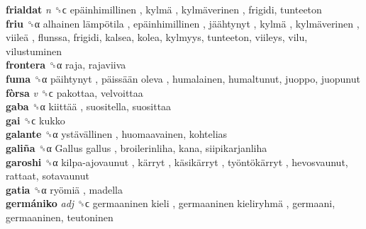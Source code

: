 \textbf{frialdat} \emph{n}  ␝ϲ   epäinhimillinen ,  kylmä ,  kylmäverinen , frigidi, tunteeton  \\
\textbf{friu} ␝α   alhainen lämpötila ,  epäinhimillinen ,  jäähtynyt ,  kylmä ,  kylmäverinen ,  viileä , flunssa, frigidi, kalsea, kolea, kylmyys, tunteeton, viileys, vilu, vilustuminen  \\
\textbf{frontera} ␝α  raja, rajaviiva  \\
\textbf{fuma} ␝α   päihtynyt ,  päissään oleva , humalainen, humaltunut, juoppo, juopunut  \\
\textbf{fòrsa} \emph{v}  ␝ϲ  pakottaa, velvoittaa  \\
\textbf{gaba} ␝α   kiittää , suositella, suosittaa  \\
\textbf{gai} ␝ϲ  kukko  \\
\textbf{galante} ␝α   ystävällinen , huomaavainen, kohtelias  \\
\textbf{galiña} ␝α   Gallus gallus , broilerinliha, kana, siipikarjanliha  \\
\textbf{garoshi} ␝α   kilpa-ajovaunut ,  kärryt ,  käsikärryt ,  työntökärryt , hevosvaunut, rattaat, sotavaunut  \\
\textbf{gatia} ␝α   ryömiä , madella  \\
\textbf{germániko} \emph{adj}  ␝ϲ   germaaninen kieli ,  germaaninen kieliryhmä , germaani, germaaninen, teutoninen  \\
